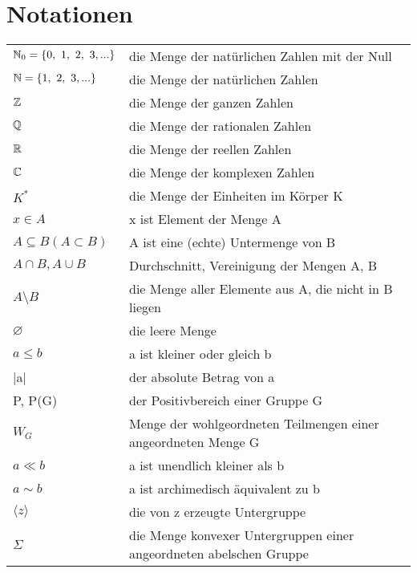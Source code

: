 \chapter{Notationen}

\begin{center}
\begin{tabular}{ll}
  $\mathbb{N}_0 = \lbrace 0,~1,~2,~3,...\rbrace$ & die Menge der natürlichen Zahlen mit der Null	\\
  $\mathbb{N} = \lbrace 1,~2,~3,...\rbrace$ & die Menge der natürlichen Zahlen \\
  $\mathbb{Z}$ & die Menge der ganzen Zahlen\\
  $\mathbb{Q}$ & die Menge der rationalen Zahlen\\
  $\mathbb{R}$ & die Menge der reellen Zahlen\\
  $\mathbb{C}$ & die Menge der komplexen Zahlen\\
  $K^*$& die Menge der Einheiten im Körper K\\
  $x \in A$ & x ist Element der Menge A\\
  $A\subseteq B (A \subset B)$& A ist eine (echte) Untermenge von B \\
  $A \cap B, A \cup B$ & Durchschnitt, Vereinigung der Mengen A, B\\
  $A \setminus B$ & die Menge aller Elemente aus A, die nicht in B liegen \\
  $\varnothing$ & die leere Menge \\
  $ a \leq b$ & a ist kleiner oder gleich b\\
  |a| & der absolute Betrag von a\\
  P, P(G) & der Positivbereich einer Gruppe G \\
  $W_G$ & Menge der wohlgeordneten Teilmengen einer angeordneten Menge G\\
  $a \ll b$ & a ist unendlich kleiner als b\\
  $a \sim b$ & a ist archimedisch äquivalent zu b\\
  $\langle z \rangle$ & die von z erzeugte Untergruppe\\
  $\Sigma$ & die Menge konvexer Untergruppen einer angeordneten abelschen Gruppe\\
 \end{tabular}
\end{center}